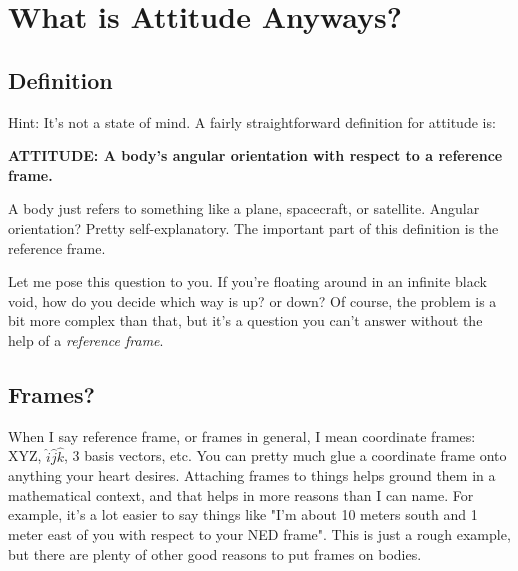 \documentclass[a4paper,14pt]{extreport}
\begin{document}
\chapter{What is Attitude Anyways?}

\section{Definition}
Hint: It's not a state of mind. A fairly straightforward definition for attitude is:

\begin{center}
\textbf{ATTITUDE: A body's angular orientation with respect to a reference frame.}
\end{center}

A body just refers to something like a plane, spacecraft, or satellite. Angular orientation? Pretty self-explanatory. The important part of this definition is the reference frame. 

Let me pose this question to you. If you're floating around in an infinite black void, how do you decide which way is up? or down? Of course, the problem is a bit more complex than that, but it's a question you can't answer without the help of a \textit{reference frame}.

\section{Frames?}

When I say reference frame, or frames in general, I mean coordinate frames: XYZ, \(\hat{i}\hat{j}\hat{k}\), 3 basis vectors, etc. You can pretty much glue a coordinate frame onto anything your heart desires. Attaching frames to things helps ground them in a mathematical context, and that helps in more reasons than I can name. For example, it's a lot easier to say things like "I'm about 10 meters south and 1 meter east of you with respect to your NED frame". This is just a rough example, but there are plenty of other good reasons to put frames on bodies.
\end{document}
